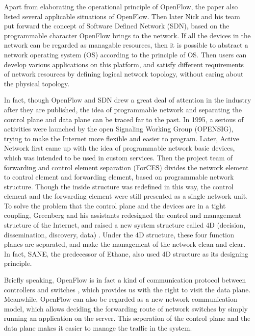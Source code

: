 Apart from elaborating the operational principle of OpenFlow, the paper also listed several applicable situations of OpenFlow. Then later Nick and his team put forward the concept of Software Defined Network (SDN), based on the programmable character OpenFlow brings to the network. If all the devices in the network can be regarded as managable resources, then it is possible to abstract a network operating system (OS) according to the principle of OS. Then users can develop various applications on this platform, and satisfy different requirements of network resources by defining logical network topology, without caring about the physical topology.

In fact, though OpenFlow and SDN drew a great deal of attention in the industry after they are published, the idea of programmable network and separating the control plane and data plane can be traced far to the past. In 1995, a serious of activities were launched by the open Signaling Working Group (OPENSIG), trying to make the Internet more flexible and easier to program. Later, Active Network first came up with the idea of programmable network basic devices, which was intended to be used in custom services. Then the project team of forwarding and control element separation (ForCES) divides the network element to control element and forwarding element, based on programmable network structure. Though the inside structure was redefined in this way, the control element and the forwarding element were still presented as a single network unit. To solve the problem that the control plane and the devices are in a tight coupling, Greenberg and his assistants redesigned the control and management structure of the Internet, and raised a new system structure called 4D (decision, dissemination, discovery, data) \cite{4d1, 4d2} . Under the 4D structure, these four function planes are separated, and make the management of the network clean and clear. In fact, SANE, the predecessor of Ethane, also used 4D structure as its designing principle.

Briefly speaking, OpenFlow is in fact a kind of communication protocol between controllers and switches \cite{openbook}, which provides us with the right to visit the data plane. Meanwhile, OpenFlow can also be regarded as a new network communication model, which allows deciding the forwarding route of network switches by simply running an application on the server. This seperation of the control plane and the data plane makes it easier to manage the traffic in the system.

